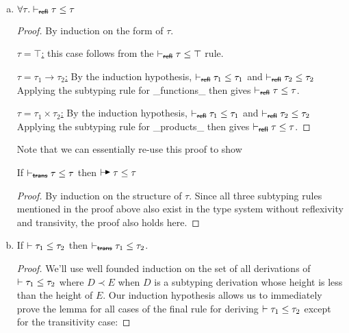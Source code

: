 \begin{enumerate}[(a)]
\item
    \begin{lemma} $\forall \tau . \subtypeNoRefl \tau \tau$ \end{lemma}
    \begin{proof} By induction on the form of $\tau$.

    \underline{$\tau = \top$:} this case follows from the $\subtypeNoRefl \tau \top$
    rule.

    \underline{$\tau = \tau_1 \rightarrow \tau_2$:} By the induction hypothesis,
    $\subtypeNoRefl{\tau_1}{\tau_1}$ and $\subtypeNoRefl{\tau_2}{\tau_2}$
    Applying the subtyping rule for _functions_ then gives
    $\subtypeNoRefl \tau \tau $.

    \underline{$\tau = \tau_1 \times \tau_2$:} By the induction hypothesis,
    $\subtypeNoRefl{\tau_1}{\tau_1}$ and $\subtypeNoRefl{\tau_2}{\tau_2}$
    Applying the subtyping rule for _products_ then gives
    $\subtypeNoRefl \tau \tau$.

    \end{proof}

    Note that we can essentially re-use this proof to show \\

    \begin{lemma} If $\subtypeNoTrans{\tau}{\tau}$ then $\algoSubtype{\tau}{\tau}$ \end{lemma}

    \begin{proof} By induction on the structure of $\tau$. Since all three subtyping rules mentioned in the proof
    above also exist in the type system without reflexivity and transivity, the proof also holds here.
    \end{proof}

\item
    \begin{lemma} If $\vdash \tau_1 \leq \tau_2$ then $\subtypeNoTrans{\tau_1}{\tau_2}$. \end{lemma}

    \begin{proof} We'll use well founded induction on the set of all derivations of $\vdash \tau_1 \leq \tau_2$ where
    $D \prec E$ when $D$ is a subtyping derivation whose height is less than the height of $E$. Our induction hypothesis
    allows us to immediately prove the lemma for all cases of the final rule for deriving $\vdash \tau_1 \leq \tau_2$
    except for the transitivity case:


\end{proof}
\end{enumerate}
